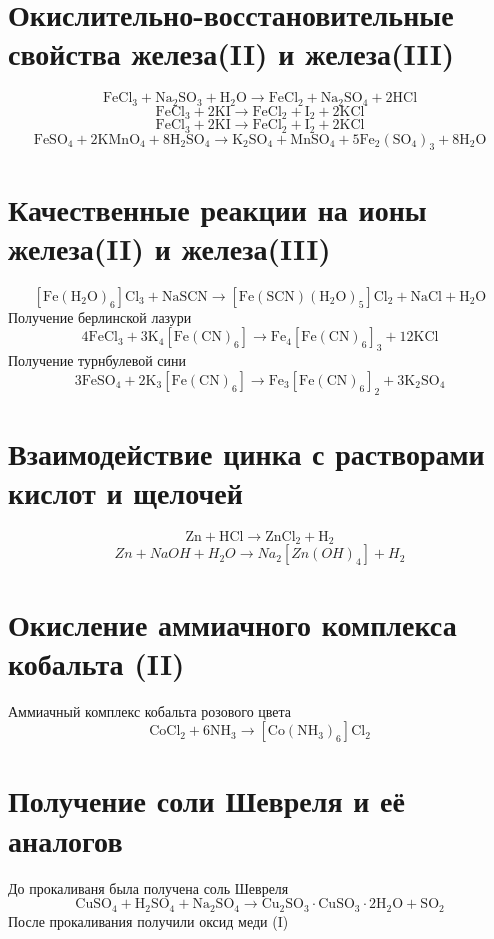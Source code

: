\documentclass[a4paper,12pt]{article}
\begin{document}
\section{Окислительно-восстановительные свойства железа(II) и железа(III)}
\begin{equation} 
\mathrm{FeCl_3 + Na_2SO_3 + H_2O  \longrightarrow FeCl_2 + Na_2SO_4 + 2HCl}
\end{equation}
\begin{equation} 
\mathrm{FeCl_3 + 2KI \longrightarrow FeCl_2 +I_2 + 2KCl}
\end{equation}
\begin{equation} 
\mathrm{FeCl_3 + 2KI \longrightarrow FeCl_2 +I_2 + 2KCl}
\end{equation}
\begin{equation} 
\mathrm{FeSO_4 + 2KMnO_4 + 8H_2SO_4 \longrightarrow K_2SO_4 + MnSO_4 + 5Fe_2(SO_4)_3 + 8H_2O}
\end{equation}
\section{Качественные реакции на ионы железа(II) и железа(III)}
\begin{equation} 
\mathrm{[Fe(H_2O)_6]Cl_3 + NaSCN \longrightarrow [Fe(SCN)(H_2O)_5]Cl_2 + NaCl + H_2O}
\end{equation}
Получение берлинской лазури
\begin{equation} 
\mathrm{4FeCl_3 +3 K_4[Fe(CN)_6] \longrightarrow Fe_4[Fe(CN)_6]_3+12KCl }
\end{equation}
Получение турнбулевой сини
\begin{equation} 
\mathrm{3FeSO_4 + 2K_3[Fe(CN)_6] \longrightarrow Fe_3[Fe(CN)_6]_2+3K_2SO_4 }
\end{equation}
\section{Взаимодействие цинка с растворами кислот и щелочей}
\begin{equation} 
\mathrm{Zn + HCl  \longrightarrow ZnCl_2 + H_2}
\end{equation}
\begin{equation} 
Zn + NaOH + H_2O \longrightarrow Na_2[Zn(OH)_4] + H_2
\end{equation}
\section{Окисление аммиачного комплекса кобальта (II)}
Аммиачный комплекс кобальта розового цвета
\begin{equation} 
\mathrm{CoCl_2 + 6NH_3 \longrightarrow [Co(NH_3)_6]Cl_2}
\end{equation}
\section{Получение соли Шевреля и её аналогов}
До прокаливаня была получена соль Шевреля
\begin{equation} 
\mathrm{CuSO_4 + H_2SO_4 + Na_2SO_4 \longrightarrow Cu_2SO_3 \cdot CuSO_3 \cdot 2H_2O + SO_2}
\end{equation}
После прокаливания получили оксид меди (I)
\end{document}
